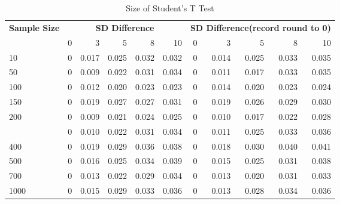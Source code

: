 \documentclass[]{article}
\begin{document}
\begin{table}

\caption{\label{tab:size-tables}Size of Student's T Test}
\centering
\begin{tabular}[t]{lrrrrrrrrrr}
\toprule
\multicolumn{1}{c}{\bfseries Sample Size} & \multicolumn{5}{c}{\bfseries SD Difference} & \multicolumn{5}{c}{\bfseries SD Difference(record round to 0)} \\
\cmidrule(l{2pt}r{2pt}){1-1} \cmidrule(l{2pt}r{2pt}){2-6} \cmidrule(l{2pt}r{2pt}){7-11}
  & 0 & 3 & 5 & 8 & 10 & 0 & 3 & 5 & 8 & 10\\
\midrule
10 & 0 & 0.017 & 0.025 & 0.032 & 0.032 & 0 & 0.014 & 0.025 & 0.033 & 0.035\\
50 & 0 & 0.009 & 0.022 & 0.031 & 0.034 & 0 & 0.011 & 0.017 & 0.033 & 0.035\\
100 & 0 & 0.012 & 0.020 & 0.023 & 0.023 & 0 & 0.014 & 0.020 & 0.023 & 0.024\\
150 & 0 & 0.019 & 0.027 & 0.027 & 0.031 & 0 & 0.019 & 0.026 & 0.029 & 0.030\\
200 & 0 & 0.009 & 0.021 & 0.024 & 0.025 & 0 & 0.010 & 0.017 & 0.022 & 0.028\\
\addlinespace
300 & 0 & 0.010 & 0.022 & 0.031 & 0.034 & 0 & 0.011 & 0.025 & 0.033 & 0.036\\
400 & 0 & 0.019 & 0.029 & 0.036 & 0.038 & 0 & 0.018 & 0.030 & 0.040 & 0.041\\
500 & 0 & 0.016 & 0.025 & 0.034 & 0.039 & 0 & 0.015 & 0.025 & 0.031 & 0.038\\
700 & 0 & 0.013 & 0.022 & 0.029 & 0.034 & 0 & 0.013 & 0.020 & 0.031 & 0.033\\
1000 & 0 & 0.015 & 0.029 & 0.033 & 0.036 & 0 & 0.013 & 0.028 & 0.034 & 0.036\\
\bottomrule
\end{tabular}
\end{table}
\end{document}

